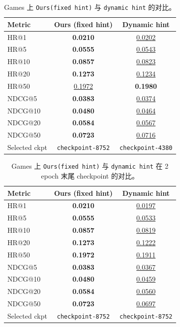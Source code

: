 \documentclass[11pt,a4paper]{ctexart}
\begin{document}
\begin{table}[H]
\centering
\scriptsize
\setlength{\tabcolsep}{4pt}
\renewcommand{\arraystretch}{1.08}
\begin{tabular}{lcc}
\toprule
Metric & Ours (fixed hint) & Dynamic hint \\
\midrule
HR@1 & \textbf{0.0210} & \underline{0.0202} \\
HR@5 & \textbf{0.0555} & \underline{0.0543} \\
HR@10 & \textbf{0.0857} & \underline{0.0823} \\
HR@20 & \textbf{0.1273} & \underline{0.1234} \\
HR@50 & \underline{0.1972} & \textbf{0.1980} \\
NDCG@5 & \textbf{0.0383} & \underline{0.0374} \\
NDCG@10 & \textbf{0.0480} & \underline{0.0464} \\
NDCG@20 & \textbf{0.0584} & \underline{0.0567} \\
NDCG@50 & \textbf{0.0723} & \underline{0.0716} \\
\midrule
Selected ckpt & \texttt{checkpoint-8752} & \texttt{checkpoint-4380} \\
\bottomrule
\end{tabular}
\caption{Games 上 \texttt{Ours(fixed hint)} 与 \texttt{dynamic hint} 的对比。}
\label{tab:genrec-only-games-hint-comparison}
\end{table}

\begin{table}[H]
\centering
\scriptsize
\setlength{\tabcolsep}{4pt}
\renewcommand{\arraystretch}{1.08}
\begin{tabular}{lcc}
\toprule
Metric & Ours (fixed hint) & Dynamic hint \\
\midrule
HR@1 & \textbf{0.0210} & \underline{0.0197} \\
HR@5 & \textbf{0.0555} & \underline{0.0533} \\
HR@10 & \textbf{0.0857} & \underline{0.0819} \\
HR@20 & \textbf{0.1273} & \underline{0.1222} \\
HR@50 & \textbf{0.1972} & \underline{0.1911} \\
NDCG@5 & \textbf{0.0383} & \underline{0.0367} \\
NDCG@10 & \textbf{0.0480} & \underline{0.0459} \\
NDCG@20 & \textbf{0.0584} & \underline{0.0560} \\
NDCG@50 & \textbf{0.0723} & \underline{0.0697} \\
\midrule
Selected ckpt & \texttt{checkpoint-8752} & \texttt{checkpoint-8752} \\
\bottomrule
\end{tabular}
\caption{Games 上 \texttt{Ours(fixed hint)} 与 \texttt{dynamic hint} 在 2 epoch 末尾 checkpoint 的对比。}
\label{tab:genrec-only-games-hint-comparison-final-epoch}
\end{table}
\end{document}
